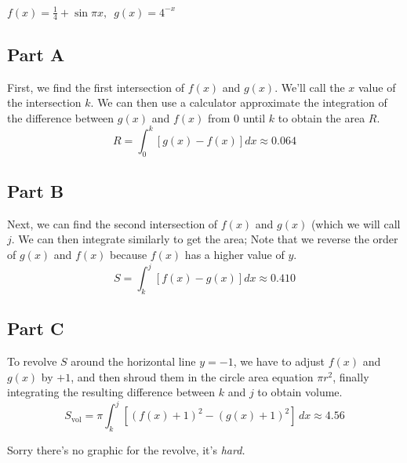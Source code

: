 \begin{center}
\end{center}

\begin{center}
	\noindent
	$f(x) = \frac{1}{4} + \sin{\pi x}, \enspace g(x) = 4^{-x}$ \\
\end{center}

\subsection{Part A}
First, we find the first intersection of $f(x)$ and $g(x)$. We'll call the $x$ value of the intersection $k$. We can then use a calculator approximate the integration of the difference between $g(x)$ and $f(x)$ from $0$ until $k$ to obtain the area $R$.
\[ R = \int_{0}^{k} [g(x) - f(x)]dx \approx 0.064 \]

\subsection{Part B}
Next, we can find the second intersection of $f(x)$ and $g(x)$ (which we will call $j$. We can then integrate similarly to get the area; Note that we reverse the order of $g(x)$ and $f(x)$ because $f(x)$ has a higher value of $y$.
\[	S = \int_{k}^{j} [f(x) - g(x)]dx \approx 0.410 \]

\subsection{Part C}
To revolve $S$ around the horizontal line $y = -1$, we have to adjust $f(x)$ and $g(x)$ by $+1$, and then shroud them in the circle area equation $\pi r^2$, finally integrating the resulting difference between $k$ and $j$ to obtain volume.
\[ S_{\text{vol}} = \pi\!\int_{k}^{j} [(f(x)+1)^2 - (g(x)+1)^2]\,dx \approx 4.56 \]

Sorry there's no graphic for the revolve, it's \textit{hard.}
